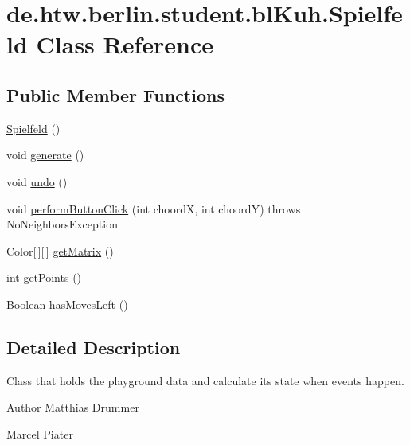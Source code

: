 \hypertarget{classde_1_1htw_1_1berlin_1_1student_1_1bl_kuh_1_1_spielfeld}{\section{de.\-htw.\-berlin.\-student.\-bl\-Kuh.\-Spielfeld Class Reference}
\label{classde_1_1htw_1_1berlin_1_1student_1_1bl_kuh_1_1_spielfeld}
}
\subsection*{Public Member Functions}
\begin{DoxyCompactItemize}
\item 
\hyperlink{classde_1_1htw_1_1berlin_1_1student_1_1bl_kuh_1_1_spielfeld_ae2a4fe2c5a8ba37144ee6e48ac3242c0}{Spielfeld} ()
\item 
void \hyperlink{classde_1_1htw_1_1berlin_1_1student_1_1bl_kuh_1_1_spielfeld_a940bddf1c60f46be6fe3852310b5706a}{generate} ()
\item 
void \hyperlink{classde_1_1htw_1_1berlin_1_1student_1_1bl_kuh_1_1_spielfeld_af35fcbf80ea3473ccf5316e55a1c33cf}{undo} ()
\item 
void \hyperlink{classde_1_1htw_1_1berlin_1_1student_1_1bl_kuh_1_1_spielfeld_a6492de4780cd44b168c89149172cd128}{perform\-Button\-Click} (int choord\-X, int choord\-Y)  throws No\-Neighbors\-Exception 
\item 
Color\mbox{[}$\,$\mbox{]}\mbox{[}$\,$\mbox{]} \hyperlink{classde_1_1htw_1_1berlin_1_1student_1_1bl_kuh_1_1_spielfeld_ad0318e304b73c0cad0476f1876a237d0}{get\-Matrix} ()
\item 
int \hyperlink{classde_1_1htw_1_1berlin_1_1student_1_1bl_kuh_1_1_spielfeld_a1961def0836db962975d8c367744def1}{get\-Points} ()
\item 
Boolean \hyperlink{classde_1_1htw_1_1berlin_1_1student_1_1bl_kuh_1_1_spielfeld_a02eba651e3ffcec3f707a57520da4c97}{has\-Moves\-Left} ()
\end{DoxyCompactItemize}


\subsection{Detailed Description}
Class that holds the playground data and calculate its state when events happen.

\begin{DoxyAuthor}{Author}
Matthias Drummer 

Marcel Piater 
\end{DoxyAuthor}


